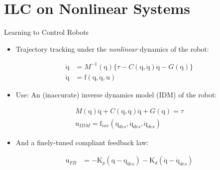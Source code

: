 \documentclass[handout]{beamer}
\newcommand{\boldvec}[1]{\boldsymbol{\mathrm{#1}}}
\let\vec\boldvec
\newcommand{\joint}{\vec{q}} %
\newcommand{\sysInput}{\vec{u}} %
\begin{document}
\section{ILC on Nonlinear Systems}
%
\begin{frame}{Learning to Control Robots}
\begin{itemize}
\item Trajectory tracking under the \emph{nonlinear} dynamics of the robot: \pause
\end{itemize}
\begin{equation*}
\begin{aligned}
\ddot{\joint} &= M^{-1}(\joint)\{ \tau - C(\joint,\dot{\joint})\dot{\joint} - G(\joint) \}\\
\ddot{\joint} &= \vec{f}(\joint,\dot{\joint},\sysInput)
\end{aligned}
\end{equation*} \pause
\begin{itemize}
\item Use: An (inaccurate) inverse dynamics model (IDM) of the robot: \pause
\end{itemize}
\begin{equation*}
\begin{aligned}
M(\joint)\ddot{\joint} + C(\joint,\dot{\joint})\dot{\joint} + G(\joint) = \tau \\
\sysInput_{IDM} = \vec{f}_{inv}(\joint_{des},\dot{\joint}_{des},\ddot{\joint}_{des})
\end{aligned}
\end{equation*}
\pause 
\begin{itemize}
\item And a finely-tuned compliant feedback law: \pause
\end{itemize}
\begin{equation*}
\begin{aligned}
\sysInput_{FB} &= -\vec{K}_{p}(\joint - \joint_{des}) - \vec{K}_{d}(\dot{\joint} - \dot{\joint}_{des})
\end{aligned}
\end{equation*}
\end{frame}
%
\end{document}
